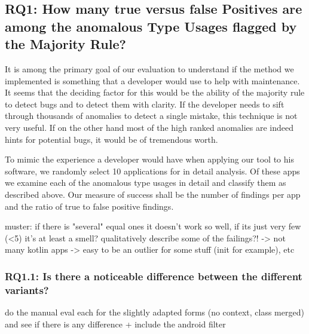 \subsection{RQ1: How many true versus false Positives are among the anomalous Type Usages flagged by the Majority Rule?}

It is among the primary goal of our evaluation to understand if the method we implemented is something that a developer would use to help with maintenance.
It seems that the deciding factor for this would be the ability of the majority rule to detect bugs and to detect them with clarity.
If the developer needs to sift through thousands of anomalies to detect a single mistake, this technique is not very useful.
If on the other hand most of the high ranked anomalies are indeed hints for potential bugs, it would be of tremendous worth.

To mimic the experience a developer would have when applying our tool to his software, we randomly select 10 applications for in detail analysis.
Of these apps we examine each of the anomalous type usages in detail and classify them as described above.
Our measure of success shall be the number of findings per app and the ratio of true to false positive findings.


muster: if there is "several" equal ones it doesn't work so well, if its just very few (<5) it's at least a smell?
qualitatively describe some of the failings?! -> not many kotlin apps -> easy to be an outlier for some stuff (init for example), etc

\subsubsection{RQ1.1: Is there a noticeable difference between the different variants?}

do the manual eval each for the slightly adapted forms (no context, class merged) and see if there is any difference
+ include the android filter

